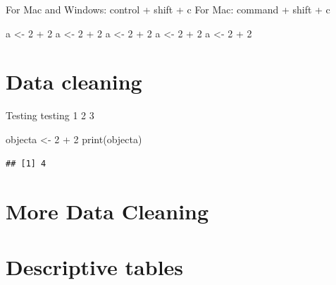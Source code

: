 \documentclass[
]{book}
\newenvironment{Shaded}{\begin{snugshade}}{\end{snugshade}}
\newcommand{\DecValTok}[1]{\textcolor[rgb]{0.00,0.00,0.81}{#1}}
\newcommand{\FunctionTok}[1]{\textcolor[rgb]{0.00,0.00,0.00}{#1}}
\newcommand{\NormalTok}[1]{#1}
\newcommand{\OtherTok}[1]{\textcolor[rgb]{0.56,0.35,0.01}{#1}}
\newcommand{\SpecialCharTok}[1]{\textcolor[rgb]{0.00,0.00,0.00}{#1}}
\begin{document}
For Mac and Windows: control + shift + c For Mac: command + shift + c

\begin{Shaded}
\begin{Highlighting}[]
\NormalTok{a }\OtherTok{\textless{}{-}} \DecValTok{2} \SpecialCharTok{+} \DecValTok{2}
\NormalTok{a }\OtherTok{\textless{}{-}} \DecValTok{2} \SpecialCharTok{+} \DecValTok{2}
\NormalTok{a }\OtherTok{\textless{}{-}} \DecValTok{2} \SpecialCharTok{+} \DecValTok{2}
\NormalTok{a }\OtherTok{\textless{}{-}} \DecValTok{2} \SpecialCharTok{+} \DecValTok{2}
\NormalTok{a }\OtherTok{\textless{}{-}} \DecValTok{2} \SpecialCharTok{+} \DecValTok{2}
\end{Highlighting}
\end{Shaded}

\hypertarget{data-cleaning}{%
\chapter{Data cleaning}\label{data-cleaning}}

Testing testing 1 2 3

\begin{Shaded}
\begin{Highlighting}[]
\NormalTok{objecta }\OtherTok{\textless{}{-}} \DecValTok{2} \SpecialCharTok{+} \DecValTok{2}
\FunctionTok{print}\NormalTok{(objecta)}
\end{Highlighting}
\end{Shaded}

\begin{verbatim}
## [1] 4
\end{verbatim}

\hypertarget{more-data-cleaning}{%
\chapter{More Data Cleaning}\label{more-data-cleaning}}

\hypertarget{descriptive-tables}{%
\chapter{Descriptive tables}\label{descriptive-tables}}

  
\end{document}
